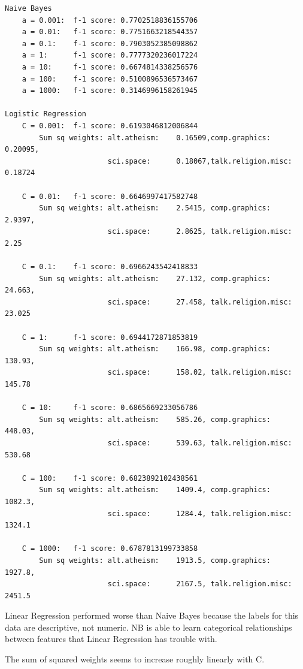 \documentclass{article}
\begin{document}
\begin{enumerate}[start=1]
\begin{Verbatim}
Naive Bayes
    a = 0.001:  f-1 score: 0.7702518836155706
    a = 0.01:   f-1 score: 0.7751663218544357
    a = 0.1:    f-1 score: 0.7903052385098862
    a = 1:      f-1 score: 0.7777320236017224
    a = 10:     f-1 score: 0.6674814338256576
    a = 100:    f-1 score: 0.5100896536573467
    a = 1000:   f-1 score: 0.3146996158261945
    
Logistic Regression
    C = 0.001:  f-1 score: 0.6193046812006844
        Sum sq weights: alt.atheism:    0.16509,comp.graphics:      0.20095,
                        sci.space:      0.18067,talk.religion.misc: 0.18724
                        
    C = 0.01:   f-1 score: 0.6646997417582748
        Sum sq weights: alt.atheism:    2.5415, comp.graphics:      2.9397,
                        sci.space:      2.8625, talk.religion.misc: 2.25
                        
    C = 0.1:    f-1 score: 0.6966243542418833
        Sum sq weights: alt.atheism:    27.132, comp.graphics:      24.663,
                        sci.space:      27.458, talk.religion.misc: 23.025
                        
    C = 1:      f-1 score: 0.6944172871853819
        Sum sq weights: alt.atheism:    166.98, comp.graphics:      130.93,
                        sci.space:      158.02, talk.religion.misc: 145.78
                        
    C = 10:     f-1 score: 0.6865669233056786
        Sum sq weights: alt.atheism:    585.26, comp.graphics:      448.03,
                        sci.space:      539.63, talk.religion.misc: 530.68
                        
    C = 100:    f-1 score: 0.6823892102438561
        Sum sq weights: alt.atheism:    1409.4, comp.graphics:      1082.3,
                        sci.space:      1284.4, talk.religion.misc: 1324.1
                        
    C = 1000:   f-1 score: 0.6787813199733858
        Sum sq weights: alt.atheism:    1913.5, comp.graphics:      1927.8,
                        sci.space:      2167.5, talk.religion.misc: 2451.5
    \end{Verbatim}
    
    Linear Regression performed worse than Naive Bayes because the labels for this data are descriptive, not numeric. NB is able to learn categorical relationships between features that Linear Regression has trouble with.
    
    The sum of squared weights seems to increase roughly linearly with C.
    

\end{enumerate}
\end{document}
